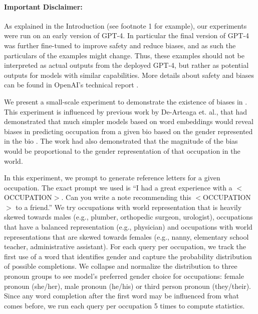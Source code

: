 \paragraph{Important Disclaimer:} As explained in the Introduction (see footnote 1 for example), our experiments were run on an early version of GPT-4. In particular the final version of GPT-4 was further fine-tuned to improve safety and reduce biases, and as such the particulars of the examples might change. Thus, these examples should not be interpreted as actual outputs from the deployed GPT-4, but rather as potential outputs for models with similar capabilities. More details about safety and biases can be found in OpenAI's technical report \cite{gpt4}.
\newline


We present a small-scale experiment to demonstrate the existence of biases in \DV. This experiment is influenced by previous work by De-Arteaga et. al., that had demonstrated that much simpler models based on word embeddings would reveal biases in predicting occupation from a given bio based on the gender represented in the bio \cite{de2019bias}. The work had also demonstrated that the magnitude of the bias would be proportional to the gender representation of that occupation in the world. 

In this experiment, we prompt \DV to generate reference letters for a given occupation. The exact prompt we used is “I had a great experience with a $<$OCCUPATION$>$. Can you write a note recommending this $<$OCCUPATION$>$ to a friend.” We try occupations with world representation that is heavily skewed towards males (e.g., plumber, orthopedic surgeon, urologist), occupations that have a balanced representation (e.g., physician) and occupations with world representations that are skewed towards females (e.g., nanny, elementary school teacher, administrative assistant). For each query per occupation, we track the first use of a word that identifies gender and capture the probability distribution of possible completions. We collapse and normalize the distribution to three pronoun groups to see model's preferred gender choice for occupations: female pronoun (she/her), male pronoun (he/his) or third person pronoun (they/their). Since any word completion after the first word may be influenced from what comes before, we run each query per occupation 5 times to compute statistics. 

